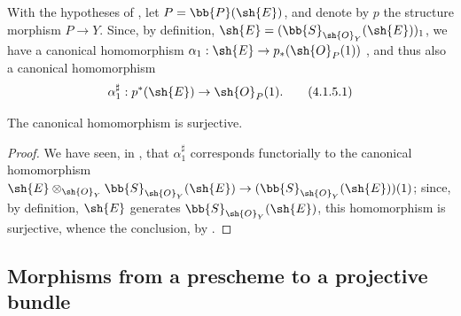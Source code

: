 \begin{env}[4.1.5]
\label{II.4.1.5}
With the hypotheses of , let $P=\bb{P}(\sh{E})$, and denote by $p$ the structure morphism $P\to Y$.
Since, by definition, $\sh{E}=(\bb{S}_{\sh{O}_Y}(\sh{E}))_1$, we have a canonical homomorphism $\alpha_1:\sh{E}\to p_*(\sh{O}_P(1))$ , and thus  also a canonical homomorphism
\[
\label{II.4.1.5.1}
  \alpha_1^\sharp: p^*(\sh{E}) \to \sh{O}_P(1).
  \tag{4.1.5.1}
\]
\end{env}

\begin{proposition}[4.1.6]
\label{II.4.1.6}
The canonical homomorphism  is surjective.
\end{proposition}

\begin{proof}
We have seen, in , that $\alpha_1^\sharp$ corresponds functorially to the canonical homomorphism $\sh{E}\otimes_{\sh{O}_Y}\bb{S}_{\sh{O}_Y}(\sh{E}) \to (\bb{S}_{\sh{O}_Y}(\sh{E}))(1)$;
since, by definition, $\sh{E}$ generates $\bb{S}_{\sh{O}_Y}(\sh{E})$, this homomorphism is surjective, whence the conclusion, by .
\end{proof}


\subsection{Morphisms from a prescheme to a projective bundle}
\label{subsection:II.4.2}

